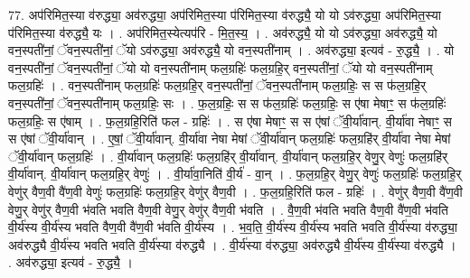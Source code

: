 \documentclass[17pt]{extarticle}
\begin{document}
77. अप॑रिमित॒स्या व॑रुद्ध्या॒ अव॑रुद्ध्या॒ अप॑रिमित॒स्या प॑रिमित॒स्या व॑रुद्ध्यै॒ यो यो ऽव॑रुद्ध्या॒ अप॑रिमित॒स्या प॑रिमित॒स्या व॑रुद्ध्यै॒ यः । . अप॑रिमित॒स्येत्यप॑रि - मि॒त॒स्य॒ । . अव॑रुद्ध्यै॒ यो यो ऽव॑रुद्ध्या॒ अव॑रुद्ध्यै॒ यो वन॒स्पती॑नां॒ ॅवन॒स्पती॑नां॒ ॅयो ऽव॑रुद्ध्या॒ अव॑रुद्ध्यै॒ यो वन॒स्पती॑नाम् । . अव॑रुद्ध्या॒ इत्यव॑ - रु॒द्ध्यै॒ । . यो वन॒स्पती॑नां॒ ॅवन॒स्पती॑नां॒ ॅयो यो वन॒स्पती॑नाम् फल॒ग्रहिः॑ फल॒ग्रहि॒र् वन॒स्पती॑नां॒ ॅयो यो वन॒स्पती॑नाम् फल॒ग्रहिः॑ । . वन॒स्पती॑नाम् फल॒ग्रहिः॑ फल॒ग्रहि॒र् वन॒स्पती॑नां॒ ॅवन॒स्पती॑नाम् फल॒ग्रहिः॒ स स फ॑ल॒ग्रहि॒र् वन॒स्पती॑नां॒ ॅवन॒स्पती॑नाम् फल॒ग्रहिः॒ सः । . फ॒ल॒ग्रहिः॒ स स फ॑ल॒ग्रहिः॑ फल॒ग्रहिः॒ स ए॑षा मेषाꣳ॒॒ स फ॑ल॒ग्रहिः॑ फल॒ग्रहिः॒ स ए॑षाम् । . फ॒ल॒ग्रहि॒रिति॑ फल - ग्रहिः॑ । . स ए॑षा मेषाꣳ॒॒ स स ए॑षां ॅवी॒र्या॑वान्. वी॒र्या॑वा नेषाꣳ॒॒ स स ए॑षां ॅवी॒र्या॑वान् । . ए॒षां॒ ॅवी॒र्या॑वान्. वी॒र्या॑वा नेषा मेषां ॅवी॒र्या॑वान् फल॒ग्रहिः॑ फल॒ग्रहि॑र् वी॒र्या॑वा नेषा मेषां ॅवी॒र्या॑वान् फल॒ग्रहिः॑ । . वी॒र्या॑वान् फल॒ग्रहिः॑ फल॒ग्रहि॑र् वी॒र्या॑वान्. वी॒र्या॑वान् फल॒ग्रहि॒र् वेणु॒र् वेणुः॑ फल॒ग्रहि॑र् वी॒र्या॑वान्. वी॒र्या॑वान् फल॒ग्रहि॒र् वेणुः॑ । . वी॒र्या॑वा॒निति॑ वी॒र्य॑ - वा॒न् । . फ॒ल॒ग्रहि॒र् वेणु॒र् वेणुः॑ फल॒ग्रहिः॑ फल॒ग्रहि॒र् वेणु॑र् वैण॒वी वै॑ण॒वी वेणुः॑ फल॒ग्रहिः॑ फल॒ग्रहि॒र् वेणु॑र् वैण॒वी । . फ॒ल॒ग्रहि॒रिति॑ फल - ग्रहिः॑ । . वेणु॑र् वैण॒वी वै॑ण॒वी वेणु॒र् वेणु॑र् वैण॒वी भ॑वति भवति वैण॒वी वेणु॒र् वेणु॑र् वैण॒वी भ॑वति । . वै॒ण॒वी भ॑वति भवति वैण॒वी वै॑ण॒वी भ॑वति वी॒र्य॑स्य वी॒र्य॑स्य भवति वैण॒वी वै॑ण॒वी भ॑वति वी॒र्य॑स्य । . भ॒व॒ति॒ वी॒र्य॑स्य वी॒र्य॑स्य भवति भवति वी॒र्य॑स्या व॑रुद्ध्या॒ अव॑रुद्ध्यै वी॒र्य॑स्य भवति भवति वी॒र्य॑स्या व॑रुद्ध्यै । . वी॒र्य॑स्या व॑रुद्ध्या॒ अव॑रुद्ध्यै वी॒र्य॑स्य वी॒र्य॑स्या व॑रुद्ध्यै । . अव॑रुद्ध्या॒ इत्यव॑ - रु॒द्ध्यै॒ । \newline
\pagebreak
{}
\end{document}
